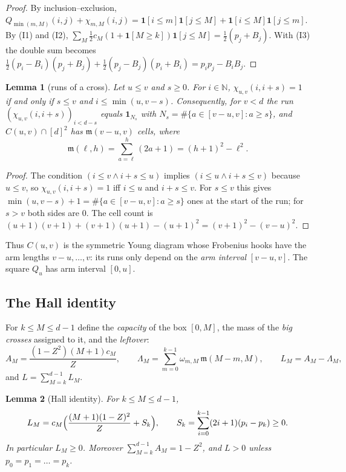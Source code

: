 \documentclass[11pt]{amsart}
\newtheorem{lemma}{Lemma}[section]
\theoremstyle{definition}
\theoremstyle{remark}
\numberwithin{equation}{section}
\newcommand{\N}{\mathbb{N}}
\newcommand{\ind}[1]{\mathbf{1}[#1]}
\newcommand{\ms}{\mathfrak{m}}
\begin{document}
\begin{proof}
By inclusion--exclusion,
$Q_{\min(m,M)}(i,j)+\chi_{m,M}(i,j)=\ind{i\le m}\ind{j\le M}+\ind{i\le M}\ind{j\le m}$. By (I1) and (I2),
$\sum_M\tfrac12c_M(1+\ind{M\ge k})\ind{j\le M}=\tfrac12(p_j+B_j)$. With (I3) the double sum becomes
$\tfrac12(p_i-B_i)(p_j+B_j)+\tfrac12(p_j-B_j)(p_i+B_i)=p_ip_j-B_iB_j$.
\end{proof}

\begin{lemma}[runs of a cross]\label{lem:crossrun}
Let $u\le v$ and $s\ge0$. For $i\in\N$, $\chi_{u,v}(i,i+s)=1$ if and only if $s\le v$ and
$i\le\min(u,v-s)$. Consequently, for $v<d$ the run $(\chi_{u,v}(i,i+s))_{i<d-s}$ equals
$\mathbf 1_{N_s}$ with $N_s=\#\{a\in[v-u,v]:a\ge s\}$, and $C(u,v)\cap[d]^2$ has
$\ms(v-u,v)$ cells, where
\[
  \ms(\ell,h)=\sum_{a=\ell}^{h}(2a+1)=(h+1)^2-\ell^2 .
\]
\end{lemma}

\begin{proof}
The condition $(i\le v\wedge i+s\le u)$ implies $(i\le u\wedge i+s\le v)$ because $u\le v$, so
$\chi_{u,v}(i,i+s)=1$ iff $i\le u$ and $i+s\le v$. For $s\le v$ this gives
$\min(u,v-s)+1=\#\{a\in[v-u,v]:a\ge s\}$ ones at the start of the run; for $s>v$ both sides are $0$.
The cell count is $(u+1)(v+1)+(v+1)(u+1)-(u+1)^2=(v+1)^2-(v-u)^2$.
\end{proof}

Thus $C(u,v)$ is the symmetric Young diagram whose Frobenius hooks have the arm lengths
$v-u,\dots,v$: its runs only depend on the \emph{arm interval} $[v-u,v]$. The square $Q_u$ has arm
interval $[0,u]$.

\subsection{The Hall identity}
For $k\le M\le d-1$ define the \emph{capacity} of the box $[0,M]$, the mass of the \emph{big crosses}
assigned to it, and the \emph{leftover}:
\[
  A_M=\frac{(1-Z^2)(M+1)c_M}{Z},\qquad \Lambda_M=\sum_{m=0}^{k-1}\omega_{m,M}\,\ms(M-m,M),\qquad
  L_M=A_M-\Lambda_M,
\]
and $L=\sum_{M=k}^{d-1}L_M$.

\begin{lemma}[Hall identity]\label{lem:hall}
For $k\le M\le d-1$,
\[
  L_M=c_M\Bigl(\frac{(M+1)(1-Z)^2}{Z}+S_k\Bigr),\qquad S_k=\sum_{i=0}^{k-1}(2i+1)(p_i-p_k)\ge0 .
\]
In particular $L_M\ge0$. Moreover $\sum_{M=k}^{d-1}A_M=1-Z^2$, and $L>0$ unless $p_0=p_1=\dots=p_k$.
\end{lemma}
\end{document}
